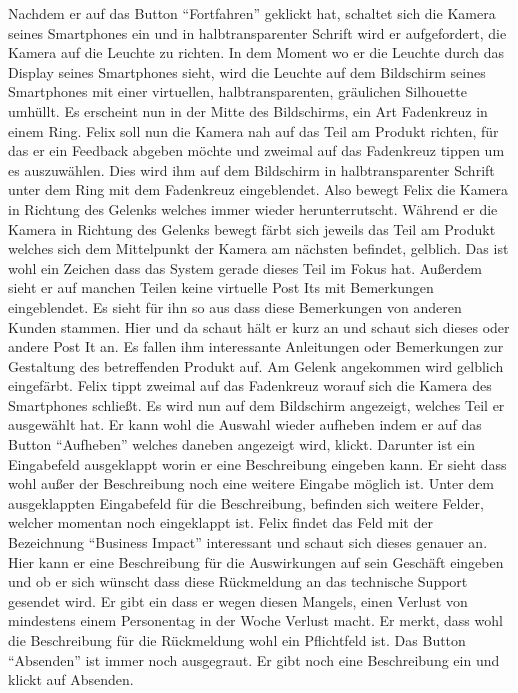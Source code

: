 Nachdem er auf das Button “Fortfahren” geklickt hat, schaltet sich die Kamera seines Smartphones
ein und in halbtransparenter Schrift wird er aufgefordert, die Kamera auf die Leuchte zu richten. 
In dem Moment wo er die Leuchte durch das Display seines Smartphones sieht, wird die Leuchte auf dem
Bildschirm seines Smartphones mit einer virtuellen, halbtransparenten, gräulichen Silhouette umhüllt. 
Es erscheint nun in der Mitte des Bildschirms, ein Art Fadenkreuz in einem Ring.
Felix soll nun die Kamera nah auf das Teil am Produkt richten, für das er ein Feedback abgeben
möchte und zweimal auf das Fadenkreuz tippen um es auszuwählen. Dies wird ihm auf dem Bildschirm in 
halbtransparenter Schrift unter dem Ring mit dem Fadenkreuz eingeblendet.
Also bewegt Felix die Kamera in Richtung des Gelenks welches immer wieder herunterrutscht. Während
er die Kamera in Richtung des Gelenks bewegt färbt sich jeweils das Teil am Produkt welches sich
dem Mittelpunkt der Kamera am nächsten befindet, gelblich. Das ist wohl ein Zeichen dass das
System gerade dieses Teil im Fokus hat. Außerdem sieht er auf manchen Teilen keine virtuelle Post
Its mit Bemerkungen eingeblendet. Es sieht für ihn so aus dass diese Bemerkungen von anderen
Kunden stammen. Hier und da schaut hält er kurz an und schaut sich dieses oder andere Post It an.
Es fallen ihm interessante Anleitungen oder Bemerkungen zur Gestaltung des betreffenden Produkt
auf.
Am Gelenk angekommen wird gelblich eingefärbt. Felix tippt zweimal auf das Fadenkreuz worauf
sich die Kamera des Smartphones schließt. Es wird nun auf dem Bildschirm angezeigt, welches Teil
er ausgewählt hat. Er kann wohl die Auswahl wieder aufheben indem er auf das Button “Aufheben”
welches daneben angezeigt wird, klickt. Darunter ist ein Eingabefeld ausgeklappt worin er eine
Beschreibung eingeben kann. Er sieht dass wohl außer der Beschreibung noch eine weitere Eingabe
möglich ist. Unter dem ausgeklappten Eingabefeld für die Beschreibung, befinden sich weitere Felder,
welcher momentan noch eingeklappt ist. Felix findet das Feld mit der Bezeichnung “Business Impact”
interessant und schaut sich dieses genauer an. Hier kann er eine Beschreibung für die Auswirkungen
auf sein Geschäft eingeben und ob er sich wünscht dass diese Rückmeldung an das technische
Support gesendet wird. Er gibt ein dass er wegen diesen Mangels, einen Verlust von mindestens
einem Personentag in der Woche Verlust macht. Er merkt, dass wohl die Beschreibung für die
Rückmeldung wohl ein Pflichtfeld ist. Das Button “Absenden” ist immer noch ausgegraut. Er gibt noch
eine Beschreibung ein und klickt auf Absenden.
